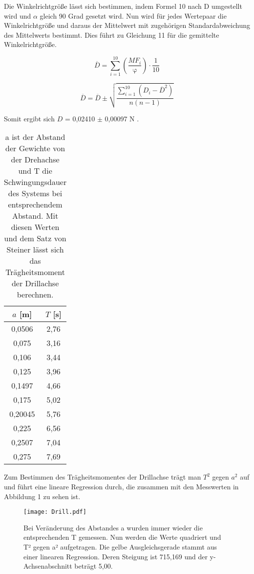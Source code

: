 \documentclass[titlepage = firstcover]{scrartcl}
\begin{document}
      Die Winkelrichtgröße lässt sich bestimmen, indem Formel 10 nach D umgestellt wird und $\alpha$ gleich 90 Grad gesetzt wird. Nun wird für jedes Wertepaar die
      Winkelrichtgröße und daraus der Mittelwert mit zugehörigen Standardabweichung des Mittelwerts bestimmt. Dies führt zu Gleichung 11 für die gemittelte Winkelrichtgröße.

      \begin{equation*}
        \overline{D} = \sum_{i=1}^{10} (\frac{MF_i}{\upvarphi}) \cdot \frac{1}{10}
      \end{equation*}

      \begin{equation}
        \overline{D} = \overline{D} \pm \sqrt{\frac{\sum_{i=1}^{10}(D_i - \overline{D}^2)}{n(n-1)}}
      \end{equation}

      Somit ergibt sich $D$ = 0,02410 $\pm$ 0,00097 N .
      \newpage
      \begin{table}[h]
        \centering
        \caption{a ist der Abstand der Gewichte von der Drehachse und T die Schwingungsdauer des Systems bei entsprechendem Abstand. Mit diesen Werten und dem Satz von Steiner lässt sich das Trägheitsmoment der Drillachse berechnen.}
        \label{tab:Tabelle_2}
        
        \begin{tabular}{c c}
          \toprule
          {$a$ [m]} & {$T$ [s]} \\
          \midrule
          0,0506 & 2,76 \\
          0,075 & 3,16 \\
          0,106 & 3,44 \\
          0,125 & 3,96 \\
          0,1497 & 4,66 \\
          0,175 & 5,02 \\
          0,20045 & 5,76 \\
          0,225 & 6,56 \\
          0,2507 & 7,04 \\
          0,275 & 7,69 \\
          \bottomrule
        \end{tabular}
      \end{table}
      
      Zum Bestimmen des Trägheitsmomentes der Drillachse trägt man $T^2$ gegen $a^2$ auf und führt eine lineare Regression durch, die zusammen mit den Messwerten
      in Abbildung 1 zu sehen ist.
      \begin{figure}[h]
        \centering
        \texttt{[image: Drill.pdf]}
        \caption{Bei Veränderung des Abstandes a wurden immer wieder die entsprechenden T gemessen. Nun werden die Werte quadriert und T² gegen a² aufgetragen. Die gelbe Ausgleichsgerade stammt aus einer linearen Regression. Deren Steigung ist 715,169 und der y-Achsenabschnitt beträgt 5,00.}
      \end{figure}
      
\end{document}
